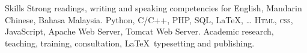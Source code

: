\begin{rubric}{Skills}
    \entry*[Languages]
    Strong readings, writing and speaking competencies for English, Mandarin Chinese, Bahasa Malaysia.
    Python, C/C++, PHP, SQL, \LaTeX, \ldots
    \textsc{Html, css}, JavaScript, Apache Web Server, Tomcat Web Server.
    \entry*[Misc.]
    Academic research, teaching, training, consultation, \LaTeX\ typesetting and publishing.
\end{rubric}
